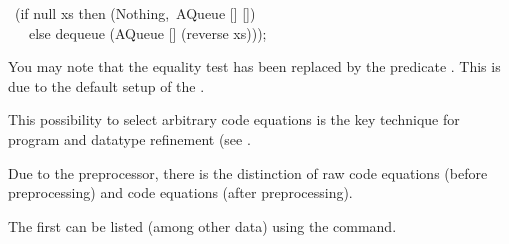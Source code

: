 \begin{isabellebody}
\begin{isamarkuptext}
\hspace*{0pt} ~(if null xs then (Nothing,~AQueue [] [])\\
\hspace*{0pt} ~~~else dequeue (AQueue [] (reverse xs)));%
\end{isamarkuptext}%
\isamarkuptrue%
%
\endisatagquote
{\isafoldquote}%
%
\isadelimquote
%
\endisadelimquote
%
\begin{isamarkuptext}%
\noindent You may note that the equality test  has
  been replaced by the predicate .  This is due
  to the default setup of the .

  This possibility to select arbitrary code equations is the key
  technique for program and datatype refinement (see
  .

  Due to the preprocessor, there is the distinction of raw code
  equations (before preprocessing) and code equations (after
  preprocessing).

  The first can be listed (among other data) using the \hypertarget{command.print-codesetup}{\hyperlink{command.print-codesetup}{\mbox{}}} command.


\end{isamarkuptext}
\end{isabellebody}
